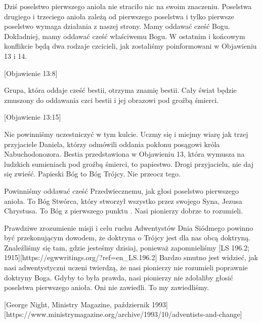 Dziś poselstwo pierwszego anioła nie straciło nic na swoim znaczeniu. Poselstwa drugiego i trzeciego anioła zależą od pierwszego poselstwa i tylko pierwsze poselstwo wymaga działania z naszej strony. Mamy oddawać cześć Bogu. Dokładniej, mamy oddawać cześć właściwemu Bogu. W ostatnim i końcowym konflikcie będą dwa rodzaje czcicieli, jak zostaliśmy poinformowani w Objawieniu 13 i 14.

[Objawienie 13:8]

Grupa, która oddaje cześć bestii, otrzyma znamię bestii. Cały świat będzie zmuszony do oddawania czci bestii i jej obrazowi pod groźbą śmierci.

[Objawienie 13:15]

Nie powinniśmy uczestniczyć w tym kulcie. Uczmy się i miejmy wiarę jak trzej przyjaciele Daniela, którzy odmówili oddania pokłonu posągowi króla Nabuchodonozora. Bestia przedstawiona w Objawieniu 13, która wymusza na ludzkich sumieniach pod groźbą śmierci, to papiestwo. Drogi przyjacielu, nie daj się zwieść. Papieski Bóg to Bóg Trójcy. Nie przeocz tego.

Powinniśmy oddawać cześć Przedwiecznemu, jak głosi poselstwo pierwszego anioła. To Bóg Stwórca, który stworzył wszystko przez swojego Syna, Jezusa Chrystusa. To Bóg z pierwszego punktu . Nasi pionierzy dobrze to rozumieli.

Prawdziwe zrozumienie misji i celu ruchu Adwentystów Dnia Siódmego powinno być przekonującym dowodem, że doktryna o Trójcy jest dla nas obcą doktryną. Znaleźliśmy się tam, gdzie jesteśmy dzisiaj, ponieważ zapomnieliśmy [LS 196.2; 1915][https://egwwritings.org/?ref=en\_LS.196.2] Bardzo smutno jest widzieć, jak nasi adwentystyczni uczeni twierdzą, że nasi pionierzy nie rozumieli poprawnie doktryny Boga. Gdyby to była prawda, nasi pionierzy nie zdołaliby głosić poselstwa pierwszego anioła. Oni nie zawiedli. To my zawiedliśmy.

[George Night, Ministry Magazine, październik 1993][https://www.ministrymagazine.org/archive/1993/10/adventists-and-change]

